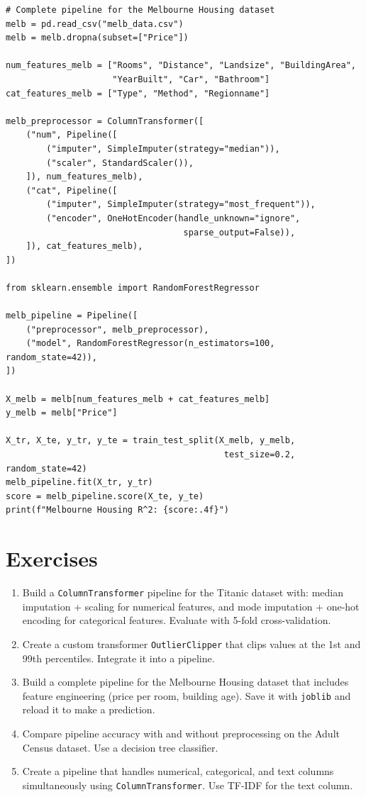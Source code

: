 \begin{verbatim}
# Complete pipeline for the Melbourne Housing dataset
melb = pd.read_csv("melb_data.csv")
melb = melb.dropna(subset=["Price"])

num_features_melb = ["Rooms", "Distance", "Landsize", "BuildingArea",
                     "YearBuilt", "Car", "Bathroom"]
cat_features_melb = ["Type", "Method", "Regionname"]

melb_preprocessor = ColumnTransformer([
    ("num", Pipeline([
        ("imputer", SimpleImputer(strategy="median")),
        ("scaler", StandardScaler()),
    ]), num_features_melb),
    ("cat", Pipeline([
        ("imputer", SimpleImputer(strategy="most_frequent")),
        ("encoder", OneHotEncoder(handle_unknown="ignore",
                                   sparse_output=False)),
    ]), cat_features_melb),
])

from sklearn.ensemble import RandomForestRegressor

melb_pipeline = Pipeline([
    ("preprocessor", melb_preprocessor),
    ("model", RandomForestRegressor(n_estimators=100, random_state=42)),
])

X_melb = melb[num_features_melb + cat_features_melb]
y_melb = melb["Price"]

X_tr, X_te, y_tr, y_te = train_test_split(X_melb, y_melb,
                                           test_size=0.2, random_state=42)
melb_pipeline.fit(X_tr, y_tr)
score = melb_pipeline.score(X_te, y_te)
print(f"Melbourne Housing R^2: {score:.4f}")
\end{verbatim}

\section{Exercises}

\begin{exercise}
\begin{enumerate}
  \item Build a \texttt{ColumnTransformer} pipeline for the Titanic dataset with: median imputation + scaling for numerical features, and mode imputation + one-hot encoding for categorical features. Evaluate with 5-fold cross-validation.
  \item Create a custom transformer \texttt{OutlierClipper} that clips values at the 1st and 99th percentiles. Integrate it into a pipeline.
  \item Build a complete pipeline for the Melbourne Housing dataset that includes feature engineering (price per room, building age). Save it with \texttt{joblib} and reload it to make a prediction.
  \item Compare pipeline accuracy with and without preprocessing on the Adult Census dataset. Use a decision tree classifier.
  \item Create a pipeline that handles numerical, categorical, and text columns simultaneously using \texttt{ColumnTransformer}. Use TF-IDF for the text column.
\end{enumerate}
\end{exercise}

